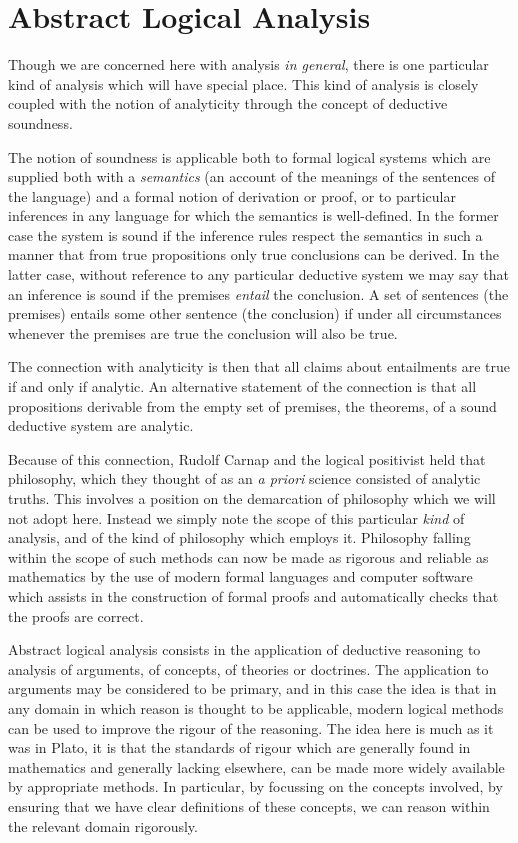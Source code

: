 
\section{Abstract Logical Analysis}

Though we are concerned here with analysis \emph{in general}, there is
one particular kind of analysis which will have special place.
This kind of analysis is closely coupled with the notion of
analyticity through the concept of deductive soundness.

The notion of soundness is applicable both to formal logical systems
which are supplied both with a \emph{semantics} (an account of the
meanings of the sentences of the language) and a formal notion of
derivation or proof, or to particular inferences in any language for
which the semantics is well-defined.
In the former case the system is sound if the inference rules respect
the semantics in such a manner that from true propositions only true
conclusions can be derived.
In the latter case, without reference to any particular deductive
system we may say that an inference is sound if the premises
\emph{entail} the conclusion.
A set of sentences (the premises) entails some other sentence (the
conclusion) if under all circumstances whenever the premises are true
the conclusion will also be true. 

The connection with analyticity is then that all claims about
entailments are true if and only if analytic.
An alternative statement of the connection is that all propositions
derivable from the empty set of premises, the theorems, of a sound
deductive system are analytic.

Because of this connection, Rudolf Carnap and the logical positivist
held that philosophy, which they thought of as an \emph{a priori}
science consisted of analytic truths.
This involves a position on the demarcation of philosophy which we
will not adopt here.
Instead we simply note the scope of this particular \emph{kind} of
analysis, and of the kind of philosophy which employs it.
Philosophy falling within the scope of such methods can now be made as
rigorous and reliable as mathematics by the use of modern formal
languages and computer software which assists in the construction of
formal proofs and automatically checks that the proofs are correct.

Abstract logical analysis consists in the application of deductive
reasoning to analysis of arguments, of concepts, of theories or
doctrines. 
The application to arguments may be considered to be primary, and in
this case the idea is that in any domain in which reason is thought to
be applicable, modern logical methods can be used to improve the
rigour of the reasoning. 
The idea here is much as it was in Plato, it is that the standards of
rigour which are generally found in mathematics and generally lacking
elsewhere, can be made more widely available by appropriate methods. 
In particular, by focussing on the concepts involved, by ensuring that
we have clear definitions of these concepts, we can reason within the
relevant domain rigorously.

